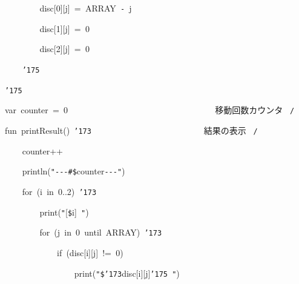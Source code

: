 \documentclass[a4paper,10pt]{article}
\def\mc{\relax}
\begin{document}
\noindent
\mbox{}{\tt\mc \ }{\tt\mc \ }{\tt\mc \ }{\tt\mc \ }{\tt\mc \ }{\tt\mc \ }{\tt\mc \ }{\tt\mc \ }disc[0][j]{\tt\mc \ }={\tt\mc \ }ARRAY{\tt\mc \ }{\tt -}{\tt\mc \ }j

\noindent
\mbox{}{\tt\mc \ }{\tt\mc \ }{\tt\mc \ }{\tt\mc \ }{\tt\mc \ }{\tt\mc \ }{\tt\mc \ }{\tt\mc \ }disc[1][j]{\tt\mc \ }={\tt\mc \ }0

\noindent
\mbox{}{\tt\mc \ }{\tt\mc \ }{\tt\mc \ }{\tt\mc \ }{\tt\mc \ }{\tt\mc \ }{\tt\mc \ }{\tt\mc \ }disc[2][j]{\tt\mc \ }={\tt\mc \ }0

\noindent
\mbox{}{\tt\mc \ }{\tt\mc \ }{\tt\mc \ }{\tt\mc \ }{\tt\char'175}

\noindent
\mbox{}{\tt\char'175}

\noindent
\mbox{}\hfill

\noindent
\mbox{}var{\tt\mc \ }counter{\tt\mc \ }={\tt\mc \ }0{\tt\mc \ \ \ \ \ \ \ \ }{\tt\mc \ \ \ \ \ \ \ \ }{\tt\mc \ \ \ \ \ \ \ \ }{\tt\mc \ \ \ \ \ \ \ \ }\rm\mc {\tt /}{\tt *}\  \ 移動回数カウンタ \hfill \rm\mc \ {\tt *}{\tt /}
\tt\mc 

\noindent
\mbox{}\hfill

\noindent
\mbox{}fun{\tt\mc \ }printResult(){\tt\mc \ }{\tt\char'173}{\tt\mc \ \ \ \ \ \ \ \ }{\tt\mc \ \ \ \ \ \ \ \ }{\tt\mc \ \ \ \ \ \ \ \ }\rm\mc {\tt /}{\tt *}\  \ 結果の表示 \hfill \rm\mc \ {\tt *}{\tt /}
\tt\mc 

\noindent
\mbox{}{\tt\mc \ }{\tt\mc \ }{\tt\mc \ }{\tt\mc \ }counter++

\noindent
\mbox{}{\tt\mc \ }{\tt\mc \ }{\tt\mc \ }{\tt\mc \ }println({\tt "}{\tt -}{\tt -}{\tt -}{\tt\#}{\tt\$}counter{\tt -}{\tt -}{\tt -}{\tt "})

\noindent
\mbox{}{\tt\mc \ }{\tt\mc \ }{\tt\mc \ }{\tt\mc \ }for{\tt\mc \ }(i{\tt\mc \ }in{\tt\mc \ }0..2){\tt\mc \ }{\tt\char'173}

\noindent
\mbox{}{\tt\mc \ }{\tt\mc \ }{\tt\mc \ }{\tt\mc \ }{\tt\mc \ }{\tt\mc \ }{\tt\mc \ }{\tt\mc \ }print({\tt "}[{\tt\$}i]{\tt\mc \ }{\tt "})

\noindent
\mbox{}{\tt\mc \ }{\tt\mc \ }{\tt\mc \ }{\tt\mc \ }{\tt\mc \ }{\tt\mc \ }{\tt\mc \ }{\tt\mc \ }for{\tt\mc \ }(j{\tt\mc \ }in{\tt\mc \ }0{\tt\mc \ }until{\tt\mc \ }ARRAY){\tt\mc \ }{\tt\char'173}

\noindent
\mbox{}{\tt\mc \ }{\tt\mc \ }{\tt\mc \ }{\tt\mc \ }{\tt\mc \ }{\tt\mc \ }{\tt\mc \ }{\tt\mc \ }{\tt\mc \ }{\tt\mc \ }{\tt\mc \ }{\tt\mc \ }if{\tt\mc \ }(disc[i][j]{\tt\mc \ }!={\tt\mc \ }0)

\noindent
\mbox{}{\tt\mc \ }{\tt\mc \ }{\tt\mc \ }{\tt\mc \ }{\tt\mc \ }{\tt\mc \ }{\tt\mc \ }{\tt\mc \ }{\tt\mc \ }{\tt\mc \ }{\tt\mc \ }{\tt\mc \ }{\tt\mc \ }{\tt\mc \ }{\tt\mc \ }{\tt\mc \ }print({\tt "}{\tt\$}{\tt\char'173}disc[i][j]{\tt\char'175}{\tt\mc \ }{\tt "})
\end{document}
